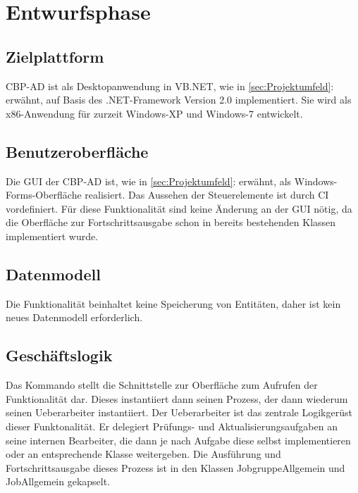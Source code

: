 
\section{Entwurfsphase} 
\label{sec:Entwurfsphase}

\subsection{Zielplattform}
\label{sec:Zielplattform}

\ac{CBP-AD} ist als Desktopanwendung in \acs{VB}.NET, wie in \ref{sec:Projektumfeld}:  erwähnt, auf Basis des .NET-Framework Version 2.0 implementiert.
Sie wird als x86-Anwendung für zurzeit Windows-XP und Windows-7 entwickelt.


\subsection{Benutzeroberfläche}
\label{sec:Benutzeroberflaeche}

Die \acs{GUI} der \ac{CBP-AD} ist, wie in \ref{sec:Projektumfeld}:  erwähnt, als Windows-Forms-Oberfläche realisiert. Das Aussehen der Steuerelemente ist durch \ac{CI} vordefiniert.
Für diese Funktionalität sind keine Änderung an der \acs{GUI} nötig, da die Oberfläche zur Fortschrittsausgabe schon in bereits bestehenden Klassen implementiert wurde.


\subsection{Datenmodell}
\label{sec:Datenmodell}

Die Funktionalität \gqq{\titel} beinhaltet keine Speicherung von Entitäten, daher ist kein neues Datenmodell erforderlich.

\clearpage
\subsection{Geschäftslogik}
\label{sec:Geschaeftslogik}

Das Kommando stellt die Schnittstelle zur Oberfläche zum Aufrufen der Funktionalität dar. Dieses instantiiert dann seinen Prozess, der dann wiederum seinen Ueberarbeiter instantiiert. Der Ueberarbeiter ist das zentrale Logikgerüst dieser Funktonalität. Er delegiert Prüfungs- und Aktualisierungsaufgaben an seine internen Bearbeiter, die dann je nach Aufgabe diese selbst implementieren oder an entsprechende Klasse weitergeben. Die Ausführung und Fortschrittsausgabe dieses Prozess ist in den Klassen JobgruppeAllgemein und JobAllgemein gekapselt.

